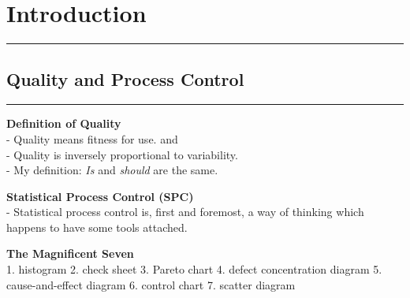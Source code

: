 \section{Introduction}
\noindent\rule[\linienAbstand]{\linewidth}{\linienDickeDick}

\subsection{Quality and Process Control}
\noindent\rule[\linienAbstand]{\linewidth}{\linienDicke}
\textbf{Definition of Quality}\\
- Quality means fitness for use. and\\
- Quality is inversely proportional to variability.\\
- My definition: \emph{Is} and \emph{should} are the same.


\textbf{Statistical Process Control (SPC)}\\
- Statistical process control is, first and foremost, a way of thinking which happens to have some tools attached.

\textbf{The Magnificent Seven}\\
1. histogram
2. check sheet
3. Pareto chart
4. defect concentration diagram
5. cause-and-effect diagram
6. control chart
7. scatter diagram
